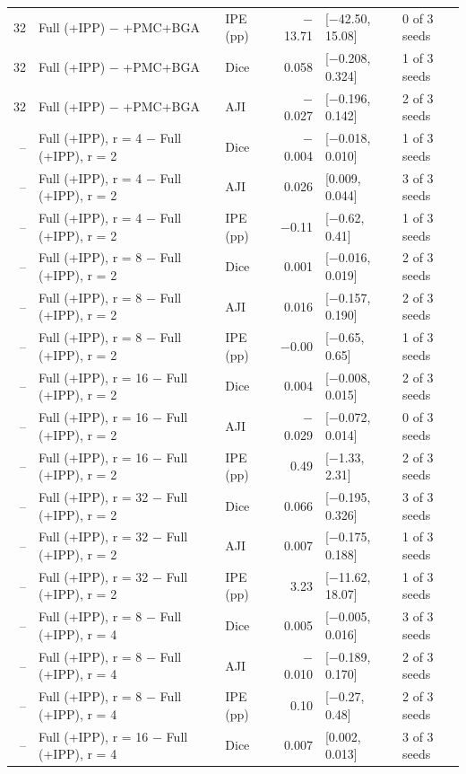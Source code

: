 \documentclass[10pt]{article}
\begin{document}
\begin{landscape}
{\begin{longtable}{r l l r l l}
32 & Full (+IPP) $-$ +PMC+BGA & IPE (pp) & $-$13.71 & [$-$42.50, 15.08] & 0 of 3 seeds \\
32 & Full (+IPP) $-$ +PMC+BGA & Dice & 0.058 & [$-$0.208, 0.324] & 1 of 3 seeds \\
32 & Full (+IPP) $-$ +PMC+BGA & AJI & $-$0.027 & [$-$0.196, 0.142] & 2 of 3 seeds \\
-- & Full (+IPP), r = 4 $-$ Full (+IPP), r = 2 & Dice & $-$0.004 & [$-$0.018, 0.010] & 1 of 3 seeds \\
-- & Full (+IPP), r = 4 $-$ Full (+IPP), r = 2 & AJI & 0.026 & [0.009, 0.044] & 3 of 3 seeds \\
-- & Full (+IPP), r = 4 $-$ Full (+IPP), r = 2 & IPE (pp) & $-$0.11 & [$-$0.62, 0.41] & 1 of 3 seeds \\
-- & Full (+IPP), r = 8 $-$ Full (+IPP), r = 2 & Dice & 0.001 & [$-$0.016, 0.019] & 2 of 3 seeds \\
-- & Full (+IPP), r = 8 $-$ Full (+IPP), r = 2 & AJI & 0.016 & [$-$0.157, 0.190] & 2 of 3 seeds \\
-- & Full (+IPP), r = 8 $-$ Full (+IPP), r = 2 & IPE (pp) & $-$0.00 & [$-$0.65, 0.65] & 1 of 3 seeds \\
-- & Full (+IPP), r = 16 $-$ Full (+IPP), r = 2 & Dice & 0.004 & [$-$0.008, 0.015] & 2 of 3 seeds \\
-- & Full (+IPP), r = 16 $-$ Full (+IPP), r = 2 & AJI & $-$0.029 & [$-$0.072, 0.014] & 0 of 3 seeds \\
-- & Full (+IPP), r = 16 $-$ Full (+IPP), r = 2 & IPE (pp) & 0.49 & [$-$1.33, 2.31] & 2 of 3 seeds \\
-- & Full (+IPP), r = 32 $-$ Full (+IPP), r = 2 & Dice & 0.066 & [$-$0.195, 0.326] & 3 of 3 seeds \\
-- & Full (+IPP), r = 32 $-$ Full (+IPP), r = 2 & AJI & 0.007 & [$-$0.175, 0.188] & 1 of 3 seeds \\
-- & Full (+IPP), r = 32 $-$ Full (+IPP), r = 2 & IPE (pp) & 3.23 & [$-$11.62, 18.07] & 1 of 3 seeds \\
-- & Full (+IPP), r = 8 $-$ Full (+IPP), r = 4 & Dice & 0.005 & [$-$0.005, 0.016] & 3 of 3 seeds \\
-- & Full (+IPP), r = 8 $-$ Full (+IPP), r = 4 & AJI & $-$0.010 & [$-$0.189, 0.170] & 2 of 3 seeds \\
-- & Full (+IPP), r = 8 $-$ Full (+IPP), r = 4 & IPE (pp) & 0.10 & [$-$0.27, 0.48] & 2 of 3 seeds \\
-- & Full (+IPP), r = 16 $-$ Full (+IPP), r = 4 & Dice & 0.007 & [0.002, 0.013] & 3 of 3 seeds \\

\end{longtable}}
\end{landscape}
\end{document}
